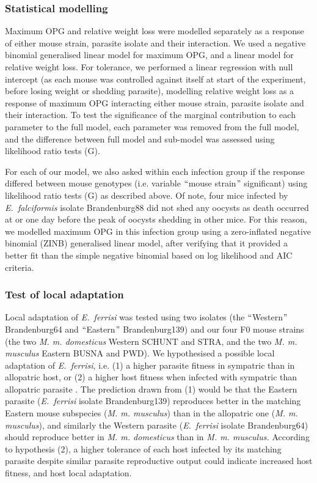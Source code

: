 \subsubsection{Statistical modelling}

Maximum OPG and relative weight loss were modelled separately as a response of either mouse strain, parasite isolate and their interaction. We used a negative binomial generalised linear model for maximum OPG, and a linear model for relative weight loss. For tolerance, we performed a linear regression with null intercept (as each mouse was controlled against itself at start of the experiment, before losing weight or shedding parasite), modelling relative weight loss as a response of maximum OPG interacting either mouse strain, parasite isolate and their interaction. To test the significance of the marginal contribution to each parameter to the full model, each parameter was removed from the full model, and the difference between full model and sub-model was assessed using likelihood ratio tests (G). \par

For each of our model, we also asked within each infection group if the response differed between mouse genotypes (i.e. variable $``$mouse strain$"$  significant) using likelihood ratio tests (G) as described above. Of note, four mice infected by\textit{ E.~falciformis} isolate Brandenburg88 did not shed any oocysts as death occurred at or one day before the peak of oocysts shedding in other mice. For this reason, we modelled maximum OPG in this infection group using a zero-inflated negative binomial (ZINB) generalised linear model, after verifying that it provided a better fit than the simple negative binomial based on log likelihood and AIC criteria.\par

\subsubsection{Test of local adaptation}

Local adaptation of \textit{E.~ferrisi} was tested using two isolates (the $``$Western$"$  Brandenburg64 and $``$Eastern$"$  Brandenburg139) and our four F0 mouse strains (the two \textit{M. m. domesticus} Western SCHUNT and STRA, and the two \textit{M. m. musculus }Eastern BUSNA and PWD). We hypothesised a possible local adaptation of \textit{E.~ferrisi}, i.e. (1) a higher parasite fitness in sympatric than in allopatric host, or (2) a higher host fitness when infected with sympatric than allopatric parasite \citep{Kaltz1998}. The prediction drawn from (1) would be that the Eastern parasite (\textit{E.~ferrisi} isolate Brandenburg139) reproduces better in the matching Eastern mouse subspecies (\textit{M. m. musculus}) than in the allopatric one (\textit{M. m. musculus}), and similarly the Western parasite (\textit{E.~ferrisi} isolate Brandenburg64) should reproduce better in \textit{M. m. domesticus} than in \textit{M. m. musculus.} According to hypothesis (2), a higher tolerance of each host infected by its matching parasite despite similar parasite reproductive output could indicate increased host fitness, and host local adaptation.\par

